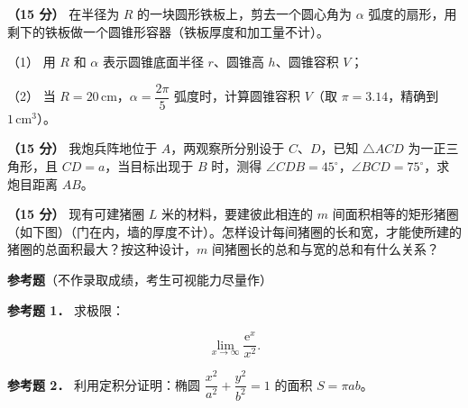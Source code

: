 \begin{question}
\textbf{（15 分）} 在半径为 $R$ 的一块圆形铁板上，剪去一个圆心角为 $\alpha$ 弧度的扇形，用剩下的铁板做一个圆锥形容器（铁板厚度和加工量不计）。

（1） 用 $R$ 和 $\alpha$ 表示圆锥底面半径 $r$、圆锥高 $h$、圆锥容积 $V$；

（2） 当 $R=20\,\mathrm{cm}$，$\alpha=\dfrac{2\pi}{5}$ 弧度时，计算圆锥容积 $V$（取 $\pi=3.14$，精确到 $1\,\mathrm{cm^3}$）。

\Needspace{0.4\textheight}
\end{question}
\begin{question}
\textbf{（15 分）} 我炮兵阵地位于 $A$，两观察所分别设于 $C$、$D$，已知 $\triangle ACD$ 为一正三角形，且 $CD=a$，当目标出现于 $B$ 时，测得 $\angle CDB=45^\circ$，$\angle BCD=75^\circ$，求炮目距离 $AB$。
\nopagebreak[4]
\begin{center}\end{center}
\nopagebreak[4]
\Needspace{0.4\textheight}
\end{question}
\begin{question}
\textbf{（15 分）} 现有可建猪圈 $L$ 米的材料，要建彼此相连的 $m$ 间面积相等的矩形猪圈（如下图）（门在内，墙的厚度不计）。怎样设计每间猪圈的长和宽，才能使所建的猪圈的总面积最大？按这种设计，$m$ 间猪圈长的总和与宽的总和有什么关系？
\nopagebreak[4]
\begin{center}\end{center}
\nopagebreak[4]
\begin{gktip}
\textbf{参考题}（不作录取成绩，考生可视能力尽量作）
\end{gktip}

\textbf{参考题 1．} 求极限：

\nopagebreak[4]
\[
\lim_{x\to\infty}\frac{\mathrm e^x}{x^2}.
\]

\textbf{参考题 2．} 利用定积分证明：椭圆 $\dfrac{x^2}{a^2}+\dfrac{y^2}{b^2}=1$ 的面积 $S=\pi ab$。

\end{question}
